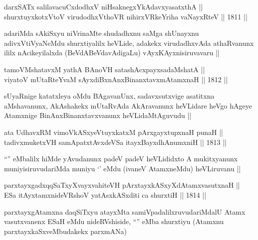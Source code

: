 \begin{shl}
darxSATx salilavacuCxdodhxV niHsaknegxYkAdavxyasatxthA || \\
shurxtuyxkotxV\s toV virudodhxV\s thoVR nihirxVRkeYriha vaNayxRteV ||  1811 ||  
\end{shl}

\begin{artha}
adariMda sAkiSxyu niVrinaMte shudadhxnu saMga shUnayxnu
adivxVtiVyaNeMdu shurxtiyalilx heVLide, adakekx virudadhxvAda
athaRvanunx ililx nAcikeyilalxda (BeVdABeVdavAdigaLu)
vAyxKAyxnisiruvavaru ||
\end{artha}


\begin{shl}
tamoVMshatavxM yathA BAnoVH satashAcxpayxsadaMshatA || \\
viyatoV mUtaRteYvaM sAyxdiBxnAnxBinanxtavxmAtamxnaH ||  1812 ||  
\end{shl}

\begin{artha}
sUyaRnige katatxleya oMdu BAgavanUnx, sadavxsutxvige asatitxna
aMshavanunx, AkAshakekx mUtaRvAda AkAravanunx heVLidare heVgo hAgeye
Atamxnige BinAnxBinanxtavxvanunx heVLidaMtAguvudu ||
\end{artha}


\begin{shl}
ata UdhavxRM vimoVkASxyeVtuyxkatxM pArxgayxtupxnaH punaH || \\
tadivxmuketxVH samApatxtAvxdeVSa itayxBayxdhAnumxniH ||  1813 ||  
\end{shl}

\begin{artha}
``\stext'' eMbalilx hiMde yAvudanunx padeV padeV heVLididxto A
  mukitxyanunx muniyisiruvudariMda muniyu `\stext' eMdu (ivaneV
  AtamxneMdu) heVLiruvanu ||
\end{artha}

\begin{shl}
parxtayxgadxqqSaTxyXvayxvahiteVH pArxtayxkASxyXdAtamxvasutxnaH || \\
ESa itAyxtamxnideVRshoV yatAsxkASxditi ca shurxtiH ||  1814 ||  
\end{shl}

\begin{artha}
parxtayxgAtamxna daqSiTxyu atayxMta samiVpadalilxruvudariMdalU Atamx
vasutxvanenx ESaH eMdu nideRVshiside, ``\stext'' eMba shurxtiyu
(Atamxnu parxtayxkaSxveMbudakekx parxmANa)
\end{artha}


